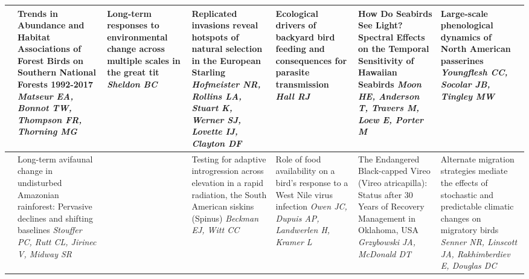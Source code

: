 \begin{tabular}{|x{0.75cm}|x{2.25cm}|a{2.25cm}|x{2.25cm}|x{2.25cm}|x{2.25cm}|x{2.25cm}|}
&Trends in Abundance and Habitat Associations of Forest Birds on Southern National Forests 1992-2017 \newline \newline \textit{Matseur EA, Bonnot TW, Thompson FR, Thorning MG} & Long-term responses to environmental change across multiple scales in the great tit \newline \newline \textit{Sheldon BC} & Replicated invasions reveal hotspots of natural selection in the European Starling \newline \newline \textit{Hofmeister NR, Rollins LA, Stuart K, Werner SJ, Lovette IJ, Clayton DF} & Ecological drivers of backyard bird feeding and consequences for parasite transmission \newline \newline \textit{Hall RJ} & How Do Seabirds See Light? Spectral Effects on the Temporal Sensitivity of Hawaiian Seabirds \newline \newline \textit{Moon HE, Anderson T, Travers M, Loew E, Porter M} & Large-scale phenological dynamics of North American passerines \newline \newline \textit{Youngflesh CC, Socolar JB, Tingley MW}\\
\hline
{}&Long-term avifaunal change in undisturbed Amazonian rainforest:  Pervasive declines and shifting baselines \newline \newline \textit{Stouffer PC, Rutt CL, Jirinec V, Midway SR} &  \newline \newline \textit{} & Testing for adaptive introgression across elevation in a rapid radiation, the South American siskins (Spinus) \newline \newline \textit{Beckman EJ, Witt CC} & Role of food availability on a bird's response to a West Nile virus infection \newline \newline \textit{Owen JC, Dupuis AP, Landwerlen H, Kramer L} & The Endangered Black-capped Vireo (Vireo atricapilla): Status after 30 Years of Recovery Management in Oklahoma, USA \newline \newline \textit{Grzybowski JA, McDonald DT} & Alternate migration strategies mediate the effects of stochastic and predictable climatic changes on migratory birds \newline \newline \textit{Senner NR, Linscott JA, Rakhimberdiev E, Douglas DC}\\

\end{tabular}
